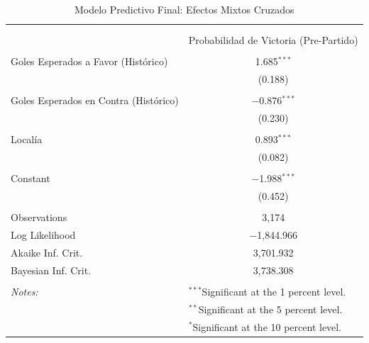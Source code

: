 
\begin{table}[!htbp] \centering 
  \caption{Modelo Predictivo Final: Efectos Mixtos Cruzados} 
  \label{} 
\begin{tabular}{@{\extracolsep{5pt}}lc} 
\\[-1.8ex]\hline 
\hline \\[-1.8ex] 
\\[-1.8ex] & Probabilidad de Victoria (Pre-Partido) \\ 
\hline \\[-1.8ex] 
 Goles Esperados a Favor (Histórico) & 1.685$^{***}$ \\ 
  & (0.188) \\ 
  & \\ 
 Goles Esperados en Contra (Histórico) & $-$0.876$^{***}$ \\ 
  & (0.230) \\ 
  & \\ 
 Localía & 0.893$^{***}$ \\ 
  & (0.082) \\ 
  & \\ 
 Constant & $-$1.988$^{***}$ \\ 
  & (0.452) \\ 
  & \\ 
Observations & 3,174 \\ 
Log Likelihood & $-$1,844.966 \\ 
Akaike Inf. Crit. & 3,701.932 \\ 
Bayesian Inf. Crit. & 3,738.308 \\ 
\hline \\[-1.8ex] 
\textit{Notes:} & \multicolumn{1}{l}{$^{***}$Significant at the 1 percent level.} \\ 
 & \multicolumn{1}{l}{$^{**}$Significant at the 5 percent level.} \\ 
 & \multicolumn{1}{l}{$^{*}$Significant at the 10 percent level.} \\ 
\end{tabular} 
\end{table} 
